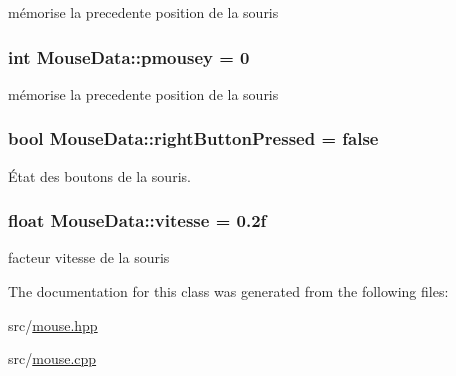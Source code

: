 mémorise la precedente position de la souris 

\hypertarget{class_mouse_data_a35be8fdf24f27e0de5ba01e44bd6eb33}{
\subsubsection[{pmousey}]{\setlength{\rightskip}{0pt plus 5cm}int Mouse\+Data\+::pmousey = 0\hspace{0.3cm}{\ttfamily [static]}}}\label{class_mouse_data_a35be8fdf24f27e0de5ba01e44bd6eb33}


mémorise la precedente position de la souris 

\hypertarget{class_mouse_data_a224b54f7b421bdb8443133db38c1ae4b}{
\subsubsection[{right\+Button\+Pressed}]{\setlength{\rightskip}{0pt plus 5cm}bool Mouse\+Data\+::right\+Button\+Pressed = false\hspace{0.3cm}{\ttfamily [static]}}}\label{class_mouse_data_a224b54f7b421bdb8443133db38c1ae4b}


État des boutons de la souris. 

\hypertarget{class_mouse_data_a86d3b28c7d10597467bb0288e6863941}{
\subsubsection[{vitesse}]{\setlength{\rightskip}{0pt plus 5cm}float Mouse\+Data\+::vitesse = 0.\+2f\hspace{0.3cm}{\ttfamily [static]}}}\label{class_mouse_data_a86d3b28c7d10597467bb0288e6863941}


facteur vitesse de la souris 



The documentation for this class was generated from the following files\+:\begin{DoxyCompactItemize}
\item 
src/\hyperlink{mouse_8hpp}{mouse.\+hpp}\item 
src/\hyperlink{mouse_8cpp}{mouse.\+cpp}\end{DoxyCompactItemize}
